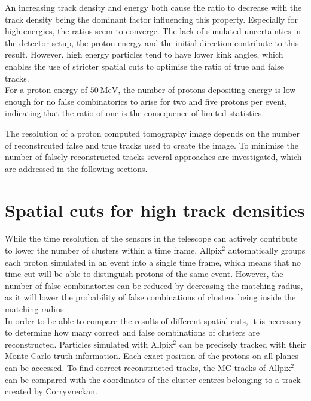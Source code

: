 An increasing track density and energy both cause the ratio to decrease with the track density being the dominant factor influencing this property. Especially for high energies,
the ratios seem to converge. The lack of simulated uncertainties in the detector setup,
the proton energy and the initial direction contribute to this result. However, high energy particles tend to have lower kink angles, which enables the use of
stricter spatial cuts to optimise the ratio of true and false tracks. \\
For a proton energy of $\SI{50}{\mega\eV}$, the number of protons depositing energy is low enough for no false combinatorics to arise for two and five
protons per event, indicating that the ratio of one is the consequence of limited statistics.

The resolution of a proton computed tomography image depends on the number of reconstrcuted false and true tracks used to create the image.
To minimise the number of falsely reconstructed tracks several approaches are
investigated, which are addressed in the following sections.



\section{Spatial cuts for high track densities} \label{sec:cuts}
While the time resolution of the sensors in the telescope can actively contribute to lower the number of clusters within a time frame,
Allpix$^2$ automatically groups each proton simulated in an event into a single time frame, which means that no time cut will be able
to distinguish protons of the same event. However, the number of false combinatorics can be reduced by decreasing the matching radius, as
it will lower the probability of false combinations of clusters being inside the matching radius. \\
In order to be able to compare the results of different spatial cuts, it is necessary to determine how many correct and false combinations of clusters
are reconstructed. Particles simulated with Allpix$^2$ can be precisely tracked with their Monte Carlo truth information. Each exact
position of the protons on all planes can be accessed. To find correct reconstructed tracks, the MC tracks of Allpix$^2$ can be
compared with the coordinates of the cluster centres belonging to a track created by Corryvreckan. \\


